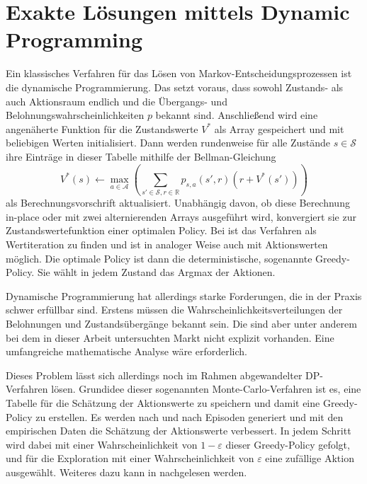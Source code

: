 \section{Exakte Lösungen mittels Dynamic Programming}
\label{section:dp}
Ein klassisches Verfahren für das Lösen von Markov-Entscheidungsprozessen ist die dynamische Programmierung.
Das setzt voraus, dass sowohl Zustands- als auch Aktionsraum endlich und die Übergangs- und Belohnungswahrscheinlichkeiten $p$ bekannt sind.
Anschließend wird eine angenäherte Funktion für die Zustandswerte $V^*$ als Array gespeichert und mit beliebigen Werten initialisiert.
Dann werden rundenweise für alle Zustände $s\in\mathcal{S}$ ihre Einträge in dieser Tabelle mithilfe der Bellman-Gleichung
\begin{equation}
	V^*(s) \leftarrow \max_{a\in\mathcal{A}}{\left(\sum_{s'\in\mathcal{S}, r \in \mathbb{R}}{p_{s, a}\left(s', r\right) \left(r + V^*(s')\right)}\right)}
\end{equation}
als Berechnungsvorschrift aktualisiert.
Unabhängig davon, ob diese Berechnung in-place oder mit zwei alternierenden Arrays ausgeführt wird, konvergiert sie zur Zustandswertefunktion einer optimalen Policy.
Bei \cite{Sutton1998} ist das Verfahren als Wertiteration zu finden und ist in analoger Weise auch mit Aktionswerten möglich.
Die optimale Policy ist dann die deterministische, sogenannte Greedy-Policy.
Sie wählt in jedem Zustand das Argmax der Aktionen.

Dynamische Programmierung hat allerdings starke Forderungen, die in der Praxis schwer erfüllbar sind.
Erstens müssen die Wahrscheinlichkeitsverteilungen der Belohnungen und Zustandsübergänge bekannt sein.
Die sind aber unter anderem bei dem in dieser Arbeit untersuchten Markt nicht explizit vorhanden.
Eine umfangreiche mathematische Analyse wäre erforderlich.

Dieses Problem lässt sich allerdings noch im Rahmen abgewandelter DP-Verfahren lösen.
Grundidee dieser sogenannten Monte-Carlo-Verfahren ist es, eine Tabelle für die Schätzung der Aktionswerte zu speichern und damit eine Greedy-Policy zu erstellen.
Es werden nach und nach Episoden generiert und mit den empirischen Daten die Schätzung der Aktionswerte verbessert.
In jedem Schritt wird dabei mit einer Wahrscheinlichkeit von $1-\varepsilon$ dieser Greedy-Policy gefolgt, und für die Exploration mit einer Wahrscheinlichkeit von $\varepsilon$ eine zufällige Aktion ausgewählt.
Weiteres dazu kann in \cite{Sutton1998} nachgelesen werden.

